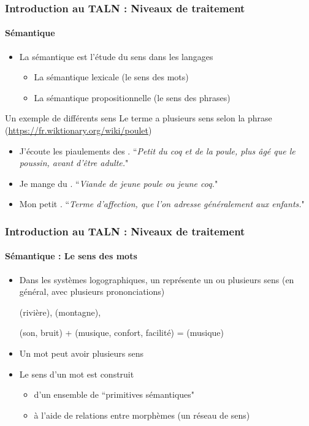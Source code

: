 \documentclass[xcolor=table]{beamer}
\begin{document}
\begin{frame}
\frametitle{Introduction au TALN : Niveaux de traitement}
\framesubtitle{Sémantique}

\begin{itemize}
	\item La sémantique est l'étude du sens dans les langages
	\begin{itemize}
		\item La sémantique lexicale (le sens des mots)
		\item La sémantique propositionnelle (le sens des phrases)
	\end{itemize}
\end{itemize}

\begin{exampleblock}{Un exemple de différents sens}
	Le terme  a plusieurs sens selon la phrase (\url{https://fr.wiktionary.org/wiki/poulet})
	\begin{itemize}
		\item J'écoute les piaulements des . ``\textit{Petit du coq et de la poule, plus âgé que le poussin, avant d'être adulte.}"
		\item Je mange du . ``\textit{Viande de jeune poule ou jeune coq.}"
		\item Mon petit . ``\textit{Terme d'affection, que l'on adresse généralement aux enfants.}"
	\end{itemize}
	
\end{exampleblock}

\end{frame}

\begin{frame}
\frametitle{Introduction au TALN : Niveaux de traitement}
\framesubtitle{Sémantique : Le sens des mots}

\begin{itemize}
	\item Dans les systèmes logographiques, un  représente un ou plusieurs sens (en général, avec plusieurs prononciations)
	
	\begin{CJK}{UTF8}{min}
		 (rivière),  (montagne), 
		
		 (son, bruit) +  (musique, confort, facilité) =  (musique)
	\end{CJK}

	\item Un mot peut avoir plusieurs sens
	\item Le sens d'un mot est construit
	\begin{itemize}
		\item d'un ensemble de ``primitives sémantiques"
		\item à l'aide de relations entre morphèmes (un réseau de sens)
	\end{itemize}
\end{itemize}

\end{frame}
\end{document}
